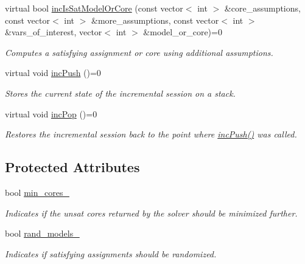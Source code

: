 \begin{DoxyCompactItemize}
virtual bool \hyperlink{classSatSolver_a29225bfab1f352cae27c68e9bda4d409}{inc\-Is\-Sat\-Model\-Or\-Core} (const vector$<$ int $>$ \&core\-\_\-assumptions, const vector$<$ int $>$ \&more\-\_\-assumptions, const vector$<$ int $>$ \&vars\-\_\-of\-\_\-interest, vector$<$ int $>$ \&model\-\_\-or\-\_\-core)=0
\begin{DoxyCompactList}\small\item\em Computes a satisfying assignment or core using additional assumptions. \end{DoxyCompactList}\item 
virtual void \hyperlink{classSatSolver_a4da0dff7082a91429e3311d279605be4}{inc\-Push} ()=0
\begin{DoxyCompactList}\small\item\em Stores the current state of the incremental session on a stack. \end{DoxyCompactList}\item 
virtual void \hyperlink{classSatSolver_a436aae045eb04141c834df0b55947ee5}{inc\-Pop} ()=0
\begin{DoxyCompactList}\small\item\em Restores the incremental session back to the point where \hyperlink{classSatSolver_a4da0dff7082a91429e3311d279605be4}{inc\-Push()} was called. \end{DoxyCompactList}\end{DoxyCompactItemize}
\subsection*{Protected Attributes}
\begin{DoxyCompactItemize}
\item 
bool \hyperlink{classSatSolver_adfeecebfd09606c82b5c57cfe5aad813}{min\-\_\-cores\-\_\-}
\begin{DoxyCompactList}\small\item\em Indicates if the unsat cores returned by the solver should be minimized further. \end{DoxyCompactList}\item 
bool \hyperlink{classSatSolver_a73fed24d8fb4da85ef82dc53ac5f28c7}{rand\-\_\-models\-\_\-}
\begin{DoxyCompactList}\small\item\em Indicates if satisfying assignments should be randomized. \end{DoxyCompactList}\end{DoxyCompactItemize}
